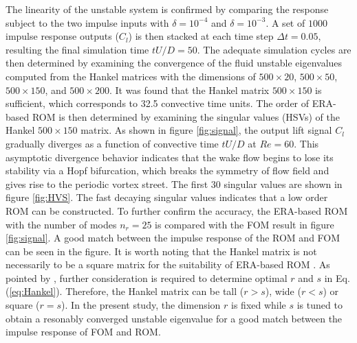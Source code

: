\documentclass{jfm}
\begin{document}
The linearity of the unstable system is 
confirmed by comparing the response subject to the two impulse inputs with $\delta=10^{-4}$ and 
$\delta=10^{-3}$. A set of $1000$ impulse response outputs ($C_l$) is then stacked at each time step $\Delta t=0.05$, resulting the final simulation time $tU/D=50$. 
The adequate simulation cycles are then determined by examining the convergence of the 
fluid unstable eigenvalues computed from the Hankel matrices with the dimensions of
$500 \times 20$, $500 \times 50$, $500 \times 150$, and $500 \times 200$. 
It was found that the Hankel matrix $500 \times 150$ is sufficient, which corresponds to 
32.5 convective time units.  
The order of ERA-based ROM  is then determined by examining 
the singular values (HSVs) of the Hankel $500 \times 150$ matrix.
%
As shown in figure \ref{fig:signal}, the output lift signal $C_l$ gradually 
diverges as a function 
of convective time $tU/D$ at $Re=60$. This asymptotic divergence behavior 
indicates that the wake flow begins to lose its stability via a Hopf bifurcation, which 
breaks the symmetry of flow field and gives rise to the periodic vortex street. 
%
The first $30$ singular values are shown in figure \ref{fig:HVS}. 
The fast decaying singular values indicates that a 
low order ROM can be constructed. 
To further confirm the accuracy, the ERA-based ROM with the number of modes $n_r =25$  
is compared with the FOM result in figure \ref{fig:signal}.
A good match between the impulse response of the ROM and FOM 
can be seen in the figure. 
%
%
It is worth noting that the Hankel matrix is not necessarily to be 
a square matrix for the suitability of ERA-based ROM \citep{Juang1985}. 
As pointed by \cite{Juang1985}, further consideration is 
required to determine optimal $r$ and $s$ in Eq. (\ref{eq:Hankel}). Therefore, the Hankel matrix can be 
tall ($r > s$), wide ($r < s$)  or square ($r = s$). 
In the present study, the dimension $r$ is fixed while $s$ is tuned 
to obtain a resonably converged unstable eigenvalue for a good 
match between the impulse response of FOM and ROM.
\end{document}

